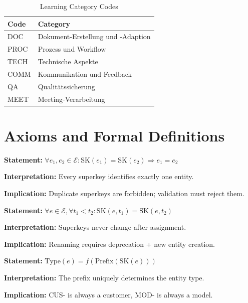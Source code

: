 \begin{table}[htbp]
\centering
\caption{Learning Category Codes}
\label{tab:learning-codes}
\begin{tabular}{@{}ll@{}}
\toprule
\textbf{Code} & \textbf{Category} \\
\midrule
DOC & Dokument-Erstellung und -Adaption \\
PROC & Prozess und Workflow \\
TECH & Technische Aspekte \\
COMM & Kommunikation und Feedback \\
QA & Qualitätssicherung \\
MEET & Meeting-Verarbeitung \\
\bottomrule
\end{tabular}
\end{table}


\section{Axioms and Formal Definitions}
\label{sec:superkey-axioms}

\begin{tcolorbox}[colback=gray!5!white, colframe=gray!75!black,
    title=Axiom UNMAPPED_SK-1: Uniqueness]
\textbf{Statement:} $\forall e_1, e_2 \in \mathcal{E}: \text{SK}(e_1) = \text{SK}(e_2) \Rightarrow e_1 = e_2$

\textbf{Interpretation:} Every superkey identifies exactly one entity.

\textbf{Implication:} Duplicate superkeys are forbidden; validation must reject them.
\end{tcolorbox}

\begin{tcolorbox}[colback=gray!5!white, colframe=gray!75!black,
    title=Axiom UNMAPPED_SK-2: Immutability]
\textbf{Statement:} $\forall e \in \mathcal{E}, \forall t_1 < t_2: \text{SK}(e, t_1) = \text{SK}(e, t_2)$

\textbf{Interpretation:} Superkeys never change after assignment.

\textbf{Implication:} Renaming requires deprecation + new entity creation.
\end{tcolorbox}

\begin{tcolorbox}[colback=gray!5!white, colframe=gray!75!black,
    title=Axiom UNMAPPED_SK-3: Prefix Determinism]
\textbf{Statement:} $\text{Type}(e) = f(\text{Prefix}(\text{SK}(e)))$

\textbf{Interpretation:} The prefix uniquely determines the entity type.

\textbf{Implication:} CUS- is always a customer, MOD- is always a model.
\end{tcolorbox}

